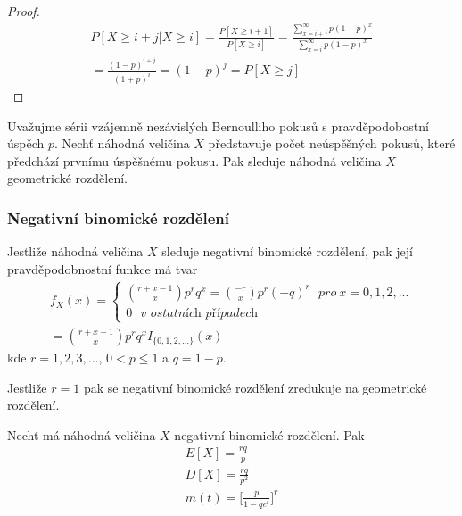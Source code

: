 \begin{proof}
\begin{gather*}
P[X \ge i + j|X \ge i] = \frac{P[X \ge i + 1]}{P[X \ge i]} = \frac{\sum_{x = i + j}^{\infty}p(1-p)^x}{\sum_{x=i}^{\infty}p(1-p)^x}\\
= \frac{(1 - p)^{i + j}}{(1 + p)^i} = (1-p)^j = P[X \ge j]
\end{gather*}
\end{proof}

\begin{example}
Uvažujme sérii vzájemně nezávislých Bernoulliho pokusů s pravděpodobostní úspěch $p$. Nechť náhodná veličina $X$ představuje počet neúspěšných pokusů, které předchází prvnímu úspěšnému pokusu. Pak sleduje náhodná veličina $X$ geometrické rozdělení.
\end{example}

\subsubsection{Negativní binomické rozdělení}

\begin{definition}
Jestliže náhodná veličina $X$ sleduje negativní binomické rozdělení, pak její pravděpodobnostní funkce má tvar
\begin{gather*}
f_X(x) =
\begin{cases}
\binom{r + x -1}{x} p^r q^x = \binom{-r}{x}p^r (-q)^r~~~\textit{pro}~x = 0, 1, 2,...\\
0~~~\textit{v ostatních případech}
\end{cases}\\
= \binom{r + x -1}{x}p^r q^x I_{\{0,1,2,...\}}(x)
\end{gather*}
kde $r = 1, 2, 3, ...$, $0 < p \le 1$ a $q = 1 - p$.
\end{definition}
Jestliže $r = 1$ pak se negativní binomické rozdělení zredukuje na geometrické rozdělení.

\begin{theorem}
Nechť má náhodná veličina $X$ negativní binomické rozdělení. Pak
\begin{gather*}
E[X] = \frac{rq}{p}\\
D[X] = \frac{rq}{p^2}\\
m(t) = \Big[\frac{p}{1 - qe^t} \Big]^r
\end{gather*}
\end{theorem}


